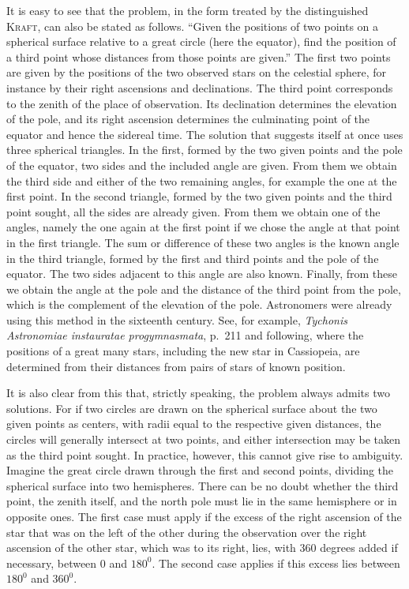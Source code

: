 It is easy to see that the problem, in the form treated by the distinguished \textsc{Kraft}, can also be stated as follows. ``Given the positions of two points on a spherical surface relative to a great circle (here the equator), find the position of a third point whose distances from those points are given.'' The first two points are given by the positions of the two observed stars on the celestial sphere, for instance by their right ascensions and declinations. The third point corresponds to the zenith of the place of observation. Its declination determines the elevation of the pole, and its right ascension determines the culminating point of the equator and hence the sidereal time. The solution that suggests itself at once uses three spherical triangles. In the first, formed by the two given points and the pole of the equator, two sides and the included angle are given. From them we obtain the third side and either of the two remaining angles, for example the one at the first point. In the second triangle, formed by the two given points and the third point sought, all the sides are already given. From them we obtain one of the angles, namely the one again at the first point if we chose the angle at that point in the first triangle. The sum or difference of these two angles is the known angle in the third triangle, formed by the first and third points and the pole of the equator. The two sides adjacent to this angle are also known. Finally, from these we obtain the angle at the pole and the distance of the third point from the pole, which is the complement of the elevation of the pole. Astronomers were already using this method in the sixteenth century. See, for example, \textit{Tychonis Astronomiae instauratae progymnasmata}, p.~211 and following, where the positions of a great many stars, including the new star in Cassiopeia, are determined from their distances from pairs of stars of known position.

It is also clear from this that, strictly speaking, the problem always admits two solutions. For if two circles are drawn on the spherical surface about the two given points as centers, with radii equal to the respective given distances, the circles will generally intersect at two points, and either intersection may be taken as the third point sought. In practice, however, this cannot give rise to ambiguity. Imagine the great circle drawn through the first and second points, dividing the spherical surface into two hemispheres. There can be no doubt whether the third point, the zenith itself, and the north pole must lie in the same hemisphere or in opposite ones. The first case must apply if the excess of the right ascension of the star that was on the left of the other during the observation over the right ascension of the other star, which was to its right, lies, with $360$ degrees added if necessary, between $0$ and $180^0$. The second case applies if this excess lies between $180^0$ and $360^0$.

